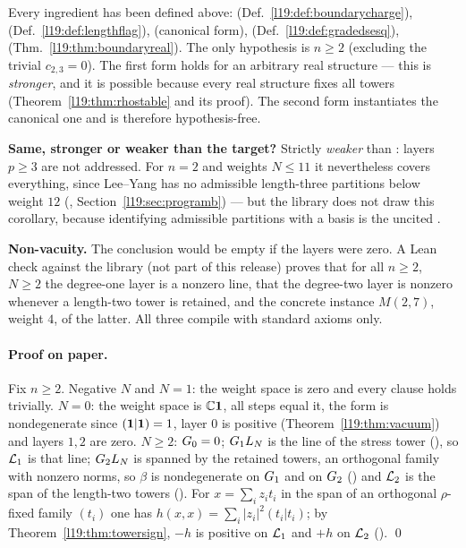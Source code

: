 \begin{dictionary}
Every ingredient has been defined above:  (Def.~\ref{l19:def:boundarycharge}),
 (Def.~\ref{l19:def:lengthflag}),  (canonical form),
 (Def.~\ref{l19:def:gradedsesq}), 
(Thm.~\ref{l19:thm:boundaryreal}). The only hypothesis is $n\ge2$ (excluding the trivial $c_{2,3} = 0$).
The first form holds for an arbitrary real structure  --- this is \emph{stronger}, and it is
possible because every real structure fixes all towers (Theorem~\ref{l19:thm:rhostable} and its proof).
The second form instantiates the canonical one and is therefore hypothesis-free.

\textbf{Same, stronger or weaker than the target?} Strictly \emph{weaker} than
: layers $p\ge3$ are not addressed. For $n=2$ and weights
$N\le 11$ it nevertheless covers everything, since Lee--Yang has no admissible length-three partitions
below weight $12$ (\allowbreak{}\allowbreak{}\allowbreak{}, Section~\ref{l19:sec:programb}) --- but the library
does not draw this corollary, because identifying admissible partitions with a basis is the uncited
.

\textbf{Non-vacuity.} The conclusion would be empty if the layers were zero. A Lean check against the
library (not part of this release) proves that for all $n\ge2$, $N\ge2$ the degree-one layer is a nonzero line,
that the degree-two layer is nonzero whenever a length-two tower is retained,
and the concrete instance $M(2,7)$, weight $4$, of the latter. All three
compile with standard axioms only.
\end{dictionary}

\paragraph{Proof on paper.} Fix $n\ge2$. Negative $N$ and $N=1$: the weight space is zero and every clause
holds trivially. $N=0$: the weight space is ${\mathbb{C}}\mathbf{1}$, all steps equal it, the form is nondegenerate
since $(\mathbf{1}|\mathbf{1}) = 1$, layer $0$ is positive (Theorem~\ref{l19:thm:vacuum}) and layers $1,2$ are
zero. $N\ge2$: $G_0 = 0$; $G_1L_N$ is the line of the stress tower
(), so $\mathcal{L}_1$ is that line; $G_2L_N$ is spanned by the
retained towers, an orthogonal family with nonzero norms, so $\beta$ is nondegenerate on $G_1$ and on
$G_2$ (\allowbreak{}\allowbreak{}\allowbreak{}\allowbreak{}\allowbreak{}) and $\mathcal{L}_2$ is the span of the
length-two towers (). For $x = \sum_iz_it_i$ in the span of an orthogonal
$\rho$-fixed family $(t_i)$ one has $h(x,x) = \sum_i|z_i|^2(t_i|t_i)$; by Theorem~\ref{l19:thm:towersign},
$-h$ is positive on $\mathcal{L}_1$ and $+h$ on $\mathcal{L}_2$ (\allowbreak{}\allowbreak{}\allowbreak{}\allowbreak{}). \qed

